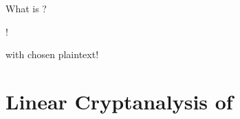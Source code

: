 \documentclass[aspectratio=169,10pt,webfont]{beamer}
\begin{document}

\begin{frame}{What is \MORUS?}

\begin{figure}[h]
  \substatesfalse
  \centering
  \resizebox{!}{0.8\textheight}{%
  
  }
\end{figure}
\end{frame}


\begin{frame}{\MiniMORUS!}

\begin{figure}[h]
  \substatesfalse
  \centering
  \resizebox{!}{0.8\textheight}{%
  
  }
\end{figure}

\end{frame}


\begin{frame}{\MiniMORUS with chosen plaintext!}

\begin{figure}[h]
  \substatesfalse
  \centering
  \resizebox{!}{0.8\textheight}{%
  
  }
\end{figure}
\end{frame}


\section{Linear Cryptanalysis of \MiniMORUS}
\end{document}
